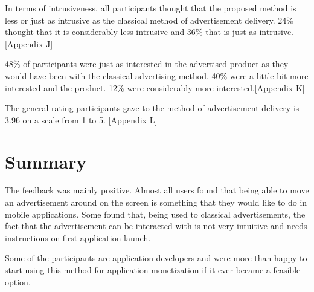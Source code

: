 In terms of intrusiveness, all participants thought that the proposed method is less or just as intrusive as the classical method of advertisement delivery. 24\% thought that it is considerably less intrusive and 36\% that is just as intrusive. [Appendix J]

48\% of participants were just as interested in the advertised product as they would have been with the classical advertising method. 40\% were a little bit more interested and the product. 12\% were considerably more interested.[Appendix K]

The general rating participants gave to the method of advertisement delivery is 3.96 on a scale from 1 to 5. [Appendix L]

\section{Summary}

The feedback was mainly positive. Almost all users found that being able to move an advertisement around on the screen is something that they would like to do in mobile applications. Some found that, being used to classical advertisements, the fact that the advertisement can be interacted with is not very intuitive and needs instructions on first application launch.

Some of the participants are application developers and were more than happy to start using this method for application monetization if it ever became a feasible option.

